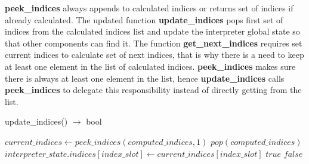 \textbf{peek\_indices} always appends to calculated indices or returns set of indices
if already calculated. The updated function \textbf{update\_indices} pops first
set of indices from the calculated indices list and update the interpreter
global state so that other components can find it. The function
\textbf{get\_next\_indices} requires set current indices to calculate set of next
indices, that is why there is a need to keep at least one element in the list of
calculated indices. \textbf{peek\_indices} makes sure there is always at least one
element in the list, hence \textbf{update\_indices} calls \textbf{peek\_indices}
to delegate this responsibility instead of directly getting from the list.

\begin{algorithm}  {update\_indices() $\rightarrow$ bool}
\singlespacing

\begin{algorithmic}[1]
\State $current\_indices \gets peek\_indices(computed\_indices, 1)$
  \State $pop(computed\_indices)$
    \State $interpreter\_state.indices[index\_slot] \gets current\_indices[index\_slot]$
  \EndFor
  \State \Return $true$
\Else
  \State \Return $false$
\EndIf
\EndFunction
\end{algorithmic}
\end{algorithm}